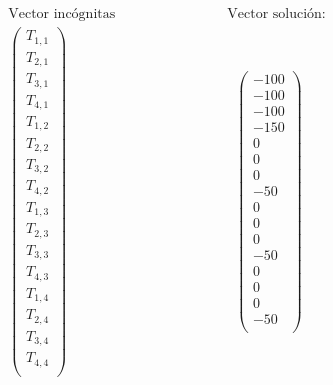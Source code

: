 \documentclass[12pt, notitlepage]{article}
\begin{document}
\begin{gather*}
\text{Vector incógnitas} \qquad \qquad \qquad \qquad \text{Vector solución:}\\
\begin{pmatrix}
T_{1,1}\\
T_{2,1}\\
T_{3,1}\\
T_{4,1}\\
T_{1,2}\\
T_{2,2}\\
T_{3,2}\\
T_{4,2}\\
T_{1,3}\\
T_{2,3}\\
T_{3,3}\\
T_{4,3}\\
T_{1,4}\\
T_{2,4}\\
T_{3,4}\\
T_{4,4}\\
\end{pmatrix} \qquad \qquad \qquad \qquad \qquad \qquad
\begin{pmatrix}
-100\\
-100\\
-100\\
-150\\
0\\
0\\
0\\
-50\\
0\\
0\\
0\\
-50\\
0\\
0\\
0\\
-50\\
\end{pmatrix}
\end{gather*}
\end{document}
